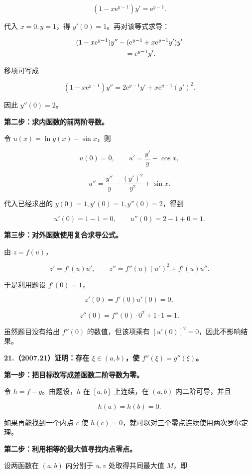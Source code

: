\documentclass[UTF8,11pt,fontset=windows]{ctexart}
\begin{document}
$$
(1-x\mathrm e^{y-1})y'=\mathrm e^{y-1}.
$$

代入 $x=0,y=1$，得 $y'(0)=1$。再对该等式求导：

$$
\begin{aligned}
&(1-x\mathrm e^{y-1})y''
 -(\mathrm e^{y-1}+x\mathrm e^{y-1}y')y'\\
&\hspace{25mm}=\mathrm e^{y-1}y'.
\end{aligned}
$$

移项可写成

$$
(1-x\mathrm e^{y-1})y''
=2\mathrm e^{y-1}y'+x\mathrm e^{y-1}(y')^2.
$$

因此 $y''(0)=2$。

\textbf{第二步：求内函数的前两阶导数。}

令 $u(x)=\ln y(x)-\sin x$，则

$$
u(0)=0,\qquad
u'=\frac{y'}y-\cos x,
$$

$$
u''=\frac{y''}y-\frac{(y')^2}{y^2}+\sin x.
$$

代入已经求出的 $y(0)=1,y'(0)=1,y''(0)=2$，得到

$$
u'(0)=1-1=0,\qquad u''(0)=2-1+0=1.
$$

\textbf{第三步：对外函数使用复合求导公式。}

由 $z=f(u)$，

$$
z'=f'(u)u',
\qquad
z''=f''(u)(u')^2+f'(u)u''.
$$

于是利用题设 $f'(0)=1$，

$$
\boxed{z'(0)=f'(0)u'(0)=0,}
$$

$$
\boxed{z''(0)=f''(0)\cdot0^2+1\cdot1=1.}
$$

虽然题目没有给出 $f''(0)$ 的数值，但该项乘有 $[u'(0)]^2=0$，因此不影响结果。

\clearpage

\textbf{21.（2007.21）证明：存在 $\xi\in(a,b)$，使 $f''(\xi)=g''(\xi)$。}

\textbf{第一步：把目标改写成差函数二阶导数为零。}

令 $h=f-g$。由题设，$h$ 在 $[a,b]$ 上连续，在 $(a,b)$ 内二阶可导，并且

$$
h(a)=h(b)=0.
$$

如果再能找到一个内点 $c$ 使 $h(c)=0$，就可以对三个零点连续使用两次罗尔定理。

\textbf{第二步：利用相等的最大值寻找内点零点。}

设两函数在 $(a,b)$ 内分别于 $u,v$ 处取得共同最大值 $M$，即
\end{document}
